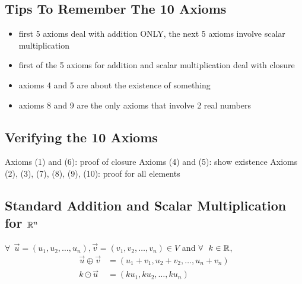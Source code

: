 \subsection*{Tips To Remember The 10 Axioms}
\begin{itemize}
  \item first 5 axioms deal with addition ONLY, the next 5 axioms involve scalar multiplication
  \item first of the 5 axioms for addition and scalar multiplication deal with closure
  \item axioms 4 and 5 are about the existence of something
  \item axioms 8 and 9 are the only axioms that involve 2 real numbers
\end{itemize}
\subsection*{Verifying the 10 Axioms}
\begin{itemize}
   Axioms (1) and (6): proof of closure
   Axioms (4) and (5): show existence
   Axioms (2), (3), (7), (8), (9), (10): proof for all elements
\end{itemize}
\subsection*{Standard Addition and Scalar Multiplication for $\mathbb{R}^n$}
$\forall~~\vec{u} = (u_1, u_2, \ldots, u_n), \vec{v} = (v_1, v_2, \ldots, v_n) \in V$ and $\forall~~k \in \mathbb{R}$,
\begin{align*}
  \vec{u} \oplus \vec{v} & = (u_1 + v_1, u_2 + v_2, \ldots, u_n + v_n) \\
  k \odot \vec{u}        & = (ku_1, ku_2, \ldots, ku_n)
\end{align*}